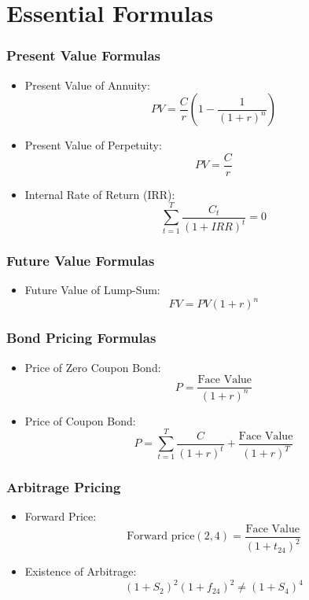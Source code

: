 \documentclass[twoside,openany]{book}
\begin{document}
\chapter*{Essential Formulas}

\subsection*{Present Value Formulas}
\begin{itemize}
    \item Present Value of Annuity:
    \[ PV = \frac{C}{r}\left(1 - \frac{1}{(1+r)^n}\right) \]
    \item Present Value of Perpetuity:
    \[ PV = \frac{C}{r} \]
    \item Internal Rate of Return (IRR):
    \[ \sum_{t=1}^T \frac{C_t}{(1+IRR)^t} = 0 \]
\end{itemize}

\subsection*{Future Value Formulas}
\begin{itemize}
    \item Future Value of Lump-Sum:
    \[ FV = PV(1 + r)^n \]
\end{itemize}

\subsection*{Bond Pricing Formulas}
\begin{itemize}
    \item Price of Zero Coupon Bond:
    \[ P = \frac{\text{Face Value}}{(1 + r)^n} \]
    \item Price of Coupon Bond:
    \[ P = \sum_{t=1}^T \frac{C}{(1 + r)^t} + \frac{\text{Face Value}}{(1 + r)^T} \]
\end{itemize}

\subsection*{Arbitrage Pricing}
\begin{itemize}
    \item Forward Price:
    \[ \text{Forward price}(2,4) = \frac{\text{Face Value}}{(1 + t_{24})^2} \]
    \item Existence of Arbitrage:
    \[ (1 + S_2)^2(1 + f_{24})^2 \neq (1 + S_4)^4 \]
\end{itemize}
\end{document}
